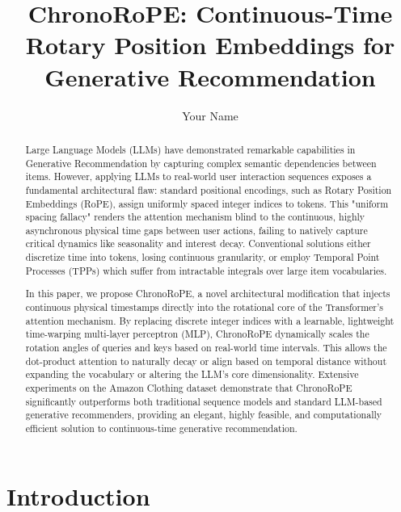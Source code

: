 \documentclass[sigconf]{acmart}
\begin{document}
\title{ChronoRoPE: Continuous-Time Rotary Position Embeddings for Generative Recommendation}

\author{Your Name}

\begin{abstract}
Large Language Models (LLMs) have demonstrated remarkable capabilities in Generative Recommendation by capturing complex semantic dependencies between items. However, applying LLMs to real-world user interaction sequences exposes a fundamental architectural flaw: standard positional encodings, such as Rotary Position Embeddings (RoPE), assign uniformly spaced integer indices to tokens. This "uniform spacing fallacy" renders the attention mechanism blind to the continuous, highly asynchronous physical time gaps between user actions, failing to natively capture critical dynamics like seasonality and interest decay. Conventional solutions either discretize time into tokens, losing continuous granularity, or employ Temporal Point Processes (TPPs) which suffer from intractable integrals over large item vocabularies. 

In this paper, we propose ChronoRoPE, a novel architectural modification that injects continuous physical timestamps directly into the rotational core of the Transformer's attention mechanism. By replacing discrete integer indices with a learnable, lightweight time-warping multi-layer perceptron (MLP), ChronoRoPE dynamically scales the rotation angles of queries and keys based on real-world time intervals. This allows the dot-product attention to naturally decay or align based on temporal distance without expanding the vocabulary or altering the LLM's core dimensionality. Extensive experiments on the Amazon Clothing dataset demonstrate that ChronoRoPE significantly outperforms both traditional sequence models and standard LLM-based generative recommenders, providing an elegant, highly feasible, and computationally efficient solution to continuous-time generative recommendation.
\end{abstract}


\maketitle

\section{Introduction}
\end{document}
